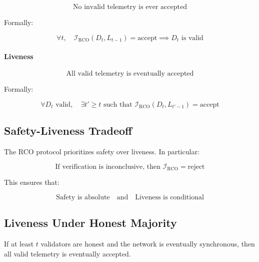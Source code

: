 \begin{equation}
\text{No invalid telemetry is ever accepted}
\end{equation}

Formally:

\begin{equation}
\forall t, \quad \mathcal{I}_{\text{RCO}}(D_t, L_{t-1}) = \text{accept} \implies D_t \text{ is valid}
\end{equation}

\paragraph{Liveness}

\begin{equation}
\text{All valid telemetry is eventually accepted}
\end{equation}

Formally:

\begin{equation}
\forall D_t \text{ valid}, \quad \exists t' \geq t \text{ such that } \mathcal{I}_{\text{RCO}}(D_t, L_{t'-1}) = \text{accept}
\end{equation}

\subsection{Safety-Liveness Tradeoff}

The RCO protocol prioritizes safety over liveness. In particular:

\begin{equation}
\text{If verification is inconclusive, then } \mathcal{I}_{\text{RCO}} = \text{reject}
\end{equation}

This ensures that:

\begin{equation}
\text{Safety is absolute} \quad \text{and} \quad \text{Liveness is conditional}
\end{equation}

\subsection{Liveness Under Honest Majority}

\begin{theorem}
If at least $t$ validators are honest and the network is eventually synchronous, then all valid telemetry is eventually accepted.
\end{theorem}

